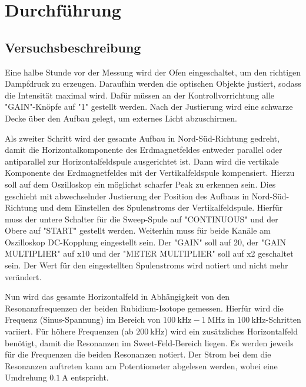 \section{Durchführung}
\label{sec:Durchführung}



\subsection{Versuchsbeschreibung}
\label{sec:Versuchsbeschreibung}

Eine halbe Stunde vor der Messung wird der Ofen eingeschaltet, um den richtigen
Dampfdruck zu erzeugen.
Daraufhin werden die optischen Objekte justiert, sodass die Intensität maximal wird.
Dafür müssen an der Kontrollvorrichtung alle "GAIN"-Knöpfe auf "1" gestellt werden. 
Nach der Justierung wird eine schwarze Decke über den Aufbau gelegt, um externes Licht 
abzuschirmen. 

Als zweiter Schritt wird der gesamte Aufbau in Nord-Süd-Richtung gedreht, damit 
die Horizontalkomponente des Erdmagnetfeldes entweder parallel oder antiparallel 
zur Horizontalfeldspule ausgerichtet ist.
Dann wird die vertikale Komponente des Erdmagnetfeldes mit der Vertikalfeldspule 
kompensiert. Hierzu soll auf dem Oszilloskop ein möglichst scharfer Peak zu erkennen sein.
Dies geschieht mit abwechselnder Justierung der Position des Aufbaus in Nord-Süd-Richtung und 
dem Einstellen des Spulenstroms der Vertikalfeldspule.
Hierfür muss der untere Schalter für die Sweep-Spule auf "CONTINUOUS" und der Obere
auf "START" gestellt werden. Weiterhin muss für beide Kanäle am Oszilloskop DC-Kopplung
eingestellt sein. Der "GAIN" soll auf 20, der "GAIN MULTIPLIER" auf x10 und der "METER
MULTIPLIER" soll auf x2 geschaltet sein. Der Wert für den eingestellten Spulenstroms
wird notiert und nicht mehr verändert.

Nun wird das gesamte Horizontalfeld in Abhängigkeit von den Resonanzfrequenzen der beiden 
Rubidium-Isotope gemessen. Hierfür wird die Frequenz (Sinus-Spannung) im Bereich
von $\SI{100}{\kilo\hertz}-\SI{1}{\mega\hertz}$ in $\SI{100}{\kilo\hertz}$-Schritten
variiert.
Für höhere Frequenzen (ab $\SI{200}{\kilo\hertz}$) wird ein zusätzliches Horizontalfeld 
benötigt, damit die Resonanzen im Sweet-Feld-Bereich liegen.
Es werden jeweils für die Frequenzen die beiden Resonanzen notiert. Der Strom bei dem 
die Resonanzen auftreten kann am Potentiometer abgelesen werden, wobei eine Umdrehung
$\SI{0,1}{\ampere}$ entspricht.
